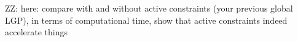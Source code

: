 \documentclass[letterpaper, 10 pt, conference]{ieeeconf}  %
\newcommand{\zz}[1]{{\color{red}ZZ: #1}}
\begin{document}
\zz{here: compare with and without active constraints (your previous global LGP), in terms of computational time, show that active constraints indeed accelerate things}



\end{document}
